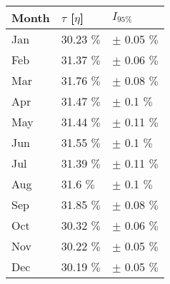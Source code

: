 \begin{tabular}{lll}
\toprule
Month & $\tau$ [$\eta$] &       $I_{95\%}$ \\
\midrule
  Jan &      30.23 $\%$ &  $\pm$ 0.05 $\%$ \\
  Feb &      31.37 $\%$ &  $\pm$ 0.06 $\%$ \\
  Mar &      31.76 $\%$ &  $\pm$ 0.08 $\%$ \\
  Apr &      31.47 $\%$ &   $\pm$ 0.1 $\%$ \\
  May &      31.44 $\%$ &  $\pm$ 0.11 $\%$ \\
  Jun &      31.55 $\%$ &   $\pm$ 0.1 $\%$ \\
  Jul &      31.39 $\%$ &  $\pm$ 0.11 $\%$ \\
  Aug &       31.6 $\%$ &   $\pm$ 0.1 $\%$ \\
  Sep &      31.85 $\%$ &  $\pm$ 0.08 $\%$ \\
  Oct &      30.32 $\%$ &  $\pm$ 0.06 $\%$ \\
  Nov &      30.22 $\%$ &  $\pm$ 0.05 $\%$ \\
  Dec &      30.19 $\%$ &  $\pm$ 0.05 $\%$ \\
\bottomrule
\end{tabular}
